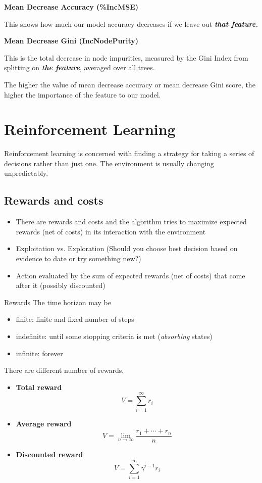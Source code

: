 \textbf{Mean Decrease Accuracy (\%IncMSE)}

This shows how much our model accuracy decreases if we leave out \textit{\textbf{that feature.}}

\textbf{Mean Decrease Gini (IncNodePurity)}

This is the total decrease in node impurities, measured by the Gini Index from splitting on \textit{\textbf{the feature}}, averaged over all trees.

The higher the value of mean decrease accuracy or mean decrease Gini score, the higher the importance of the feature to our model.

\section{Reinforcement Learning}

Reinforcement learning is concerned with finding a strategy for taking a series of decisions rather than just one.
The environment is usually changing unpredictably.

\subsection{Rewards and costs}

\begin{itemize}
    \item There are rewards and costs and the algorithm tries to maximize expected rewards (net of costs) in its interaction with the environment 
    \item Exploitation vs. Exploration (Should you choose best decision based on evidence to date or try something new?)
    \item Action evaluated by the sum of expected rewards (net of costs) that come after it (possibly discounted)
\end{itemize}

Rewards The time horizon may be
\begin{itemize}
    \item finite: finite and fixed number of steps
    \item indefinite: until some stopping criteria is met (\emph{absorbing} states)
    \item infinite: forever
\end{itemize}
There are different number of rewards.
\begin{itemize}
    \item \textbf{Total reward}
    \[
        V = \sum_{i=1}^{\infty} r_{i} 
    \]
    \item \textbf{Average reward}
    \[
        V = \lim_{n \to \infty} \frac{r_{1} + \cdots + r_{n}}{n}
    \]
    \item \textbf{Discounted reward}
    \[
        V = \sum_{i=1}^{\infty} \gamma ^{i-1} r_{i}  
    \]
\end{itemize}


